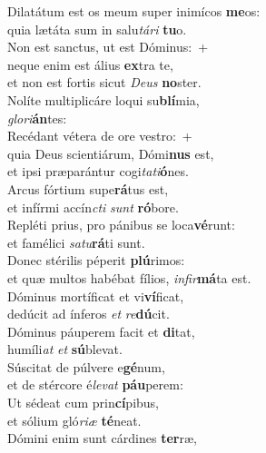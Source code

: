 \evenverse Dilatátum est os meum super inimícos \textbf{me}os:~\*\\
\evenverse quia lætáta sum in salu\textit{tá}\textit{ri} \textbf{tu}o.\\
\oddverse Non est sanctus, ut est Dóminus:~+\\
\oddverse  neque enim est álius \textbf{ex}tra te,~\*\\
\oddverse et non est fortis sicut \textit{De}\textit{us} \textbf{no}ster.\\
\evenverse Nolíte multiplicáre loqui su\textbf{blí}mia,~\*\\
\evenverse \textit{glo}\textit{ri}\textbf{án}tes:\\
\oddverse Recédant vétera de ore vestro:~+\\
\oddverse  quia Deus scientiárum, Dómi\textbf{nus} est,~\*\\
\oddverse et ipsi præparántur cogi\textit{ta}\textit{ti}\textbf{ó}nes.\\
\evenverse Arcus fórtium supe\textbf{rá}tus est,~\*\\
\evenverse et infírmi accín\textit{cti} \textit{sunt} \textbf{ró}bore.\\
\oddverse Repléti prius, pro pánibus se loca\textbf{vé}runt:~\*\\
\oddverse et famélici \textit{sa}\textit{tu}\textbf{rá}ti sunt.\\
\evenverse Donec stérilis péperit \textbf{plú}rimos:~\*\\
\evenverse et quæ multos habébat fílios, \textit{in}\textit{fir}\textbf{má}ta est.\\
\oddverse Dóminus mortíficat et vi\textbf{ví}ficat,~\*\\
\oddverse dedúcit ad ínferos \textit{et} \textit{re}\textbf{dú}cit.\\
\evenverse Dóminus páuperem facit et \textbf{di}tat,~\*\\
\evenverse humíli\textit{at} \textit{et} \textbf{sú}blevat.\\
\oddverse Súscitat de púlvere e\textbf{gé}num,~\*\\
\oddverse et de stércore é\textit{le}\textit{vat} \textbf{páu}perem:\\
\evenverse Ut sédeat cum prin\textbf{cí}pibus,~\*\\
\evenverse et sólium gló\textit{ri}\textit{æ} \textbf{té}neat.\\
\oddverse Dómini enim sunt cárdines \textbf{ter}ræ,~\*\\
